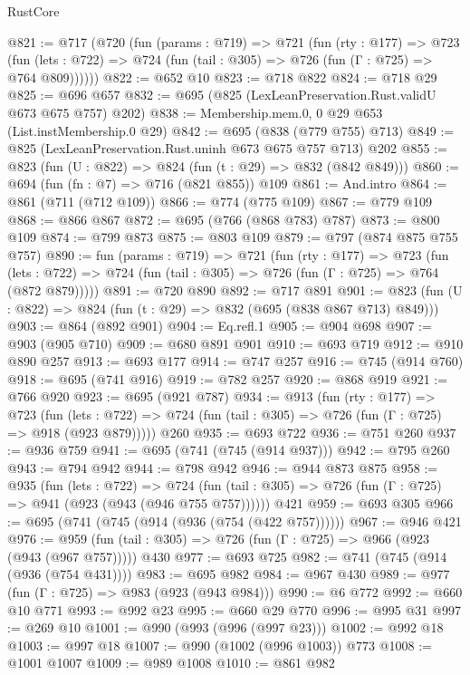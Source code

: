\begin{lexlean}{RustCore}
\begin{coremodule}
{\begin{coremodule}
{{{{{{{{{@821 := @717
    (@720
      (fun (params : @719) =>
      @721
        (fun (rty : @177) =>
        @723
          (fun (lets : @722) => @724 (fun (tail : @305) => @726 (fun (Γ : @725) => @764 @809))))))
@822 := @652 @10
@823 := @718 @822
@824 := @718 @29
@825 := @696 @657
@832 := @695 (@825 (LexLeanPreservation.Rust.validU @673 @675 @757) @202)
@838 := Membership.mem.{0, 0} @29 @653 (List.instMembership.{0} @29)
@842 := @695 (@838 (@779 @755) @713)
@849 := @825 (LexLeanPreservation.Rust.uninh @673 @675 @757 @713) @202
@855 := @823 (fun (U : @822) => @824 (fun (t : @29) => @832 (@842 @849)))
@860 := @694 (fun (fn : @7) => @716 (@821 @855)) @109
@861 := And.intro
@864 := @861 (@711 (@712 @109))
@866 := @774 (@775 @109)
@867 := @779 @109
@868 := @866 @867
@872 := @695 (@766 (@868 @783) @787)
@873 := @800 @109
@874 := @799 @873
@875 := @803 @109
@879 := @797 (@874 @875 @755 @757)
@890 := fun (params : @719) =>
  @721
    (fun (rty : @177) =>
    @723
      (fun (lets : @722) => @724 (fun (tail : @305) => @726 (fun (Γ : @725) => @764 (@872 @879)))))
@891 := @720 @890
@892 := @717 @891
@901 := @823 (fun (U : @822) => @824 (fun (t : @29) => @832 (@695 (@838 @867 @713) @849)))
@903 := @864 (@892 @901)
@904 := Eq.refl.{1}
@905 := @904 @698
@907 := @903 (@905 @710)
@909 := @680 @891 @901
@910 := @693 @719
@912 := @910 @890 @257
@913 := @693 @177
@914 := @747 @257
@916 := @745 (@914 @760)
@918 := @695 (@741 @916)
@919 := @782 @257
@920 := @868 @919
@921 := @766 @920
@923 := @695 (@921 @787)
@934 := @913
    (fun (rty : @177) =>
    @723
      (fun (lets : @722) => @724 (fun (tail : @305) => @726 (fun (Γ : @725) => @918 (@923 @879)))))
    @260
@935 := @693 @722
@936 := @751 @260
@937 := @936 @759
@941 := @695 (@741 (@745 (@914 @937)))
@942 := @795 @260
@943 := @794 @942
@944 := @798 @942
@946 := @944 @873 @875
@958 := @935
    (fun (lets : @722) =>
    @724 (fun (tail : @305) => @726 (fun (Γ : @725) => @941 (@923 (@943 (@946 @755 @757))))))
    @421
@959 := @693 @305
@966 := @695 (@741 (@745 (@914 (@936 (@754 (@422 @757))))))
@967 := @946 @421
@976 := @959 (fun (tail : @305) => @726 (fun (Γ : @725) => @966 (@923 (@943 (@967 @757))))) @430
@977 := @693 @725
@982 := @741 (@745 (@914 (@936 (@754 @431))))
@983 := @695 @982
@984 := @967 @430
@989 := @977 (fun (Γ : @725) => @983 (@923 (@943 @984)))
@990 := @6 @772
@992 := @660 @10 @771
@993 := @992 @23
@995 := @660 @29 @770
@996 := @995 @31
@997 := @269 @10
@1001 := @990 (@993 (@996 (@997 @23)))
@1002 := @992 @18
@1003 := @997 @18
@1007 := @990 (@1002 (@996 @1003)) @773
@1008 := @1001 @1007
@1009 := @989 @1008
@1010 := @861 @982
}}}}}}}}}
\end{coremodule}}
\end{coremodule}
\end{lexlean}

